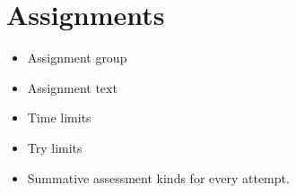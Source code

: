 
\section{Assignments}

\begin{itemize}

\item Assignment group

\item Assignment text

\item Time limits

\item Try limits

\item Summative assessment kinds for every attempt.

\end{itemize}
